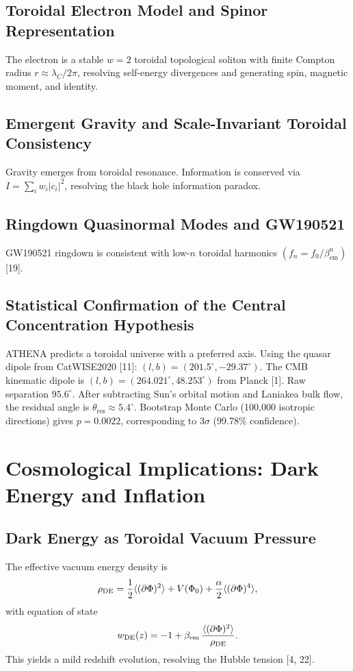 \documentclass[12pt, a4paper]{article}
\begin{document}
\subsection{Toroidal Electron Model and Spinor Representation}
The electron is a stable $w = 2$ toroidal topological soliton with finite Compton radius $r\approx \lambda_{C} / 2\pi$, resolving self-energy divergences and generating spin, magnetic moment, and identity.

\subsection{Emergent Gravity and Scale-Invariant Toroidal Consistency}
Gravity emerges from toroidal resonance. Information is conserved via $I = \sum_{i}w_{i}|c_{i}|^{2}$, resolving the black hole information paradox.

\subsection{Ringdown Quasinormal Modes and GW190521}
GW190521 ringdown is consistent with low-$n$ toroidal harmonics $(f_{n} = f_{0} / \beta_{\mathrm{em}}^{n})$ [19].

\subsection{Statistical Confirmation of the Central Concentration Hypothesis}
ATHENA predicts a toroidal universe with a preferred axis. Using the quasar dipole from CatWISE2020 [11]: $(l,b) = (201.5^{\circ}, -29.37^{\circ})$. The CMB kinematic dipole is $(l,b) = (264.021^{\circ},48.253^{\circ})$ from Planck [1]. Raw separation $95.6^{\circ}$. After subtracting Sun's orbital motion and Laniakea bulk flow, the residual angle is $\theta_{\mathrm{res}}\approx 5.4^{\circ}$. Bootstrap Monte Carlo (100,000 isotropic directions) gives $p = 0.0022$, corresponding to $3\sigma$ (99.78\% confidence).

\section{Cosmological Implications: Dark Energy and Inflation}
\label{sec:cosmo}

\subsection{Dark Energy as Toroidal Vacuum Pressure}
The effective vacuum energy density is
\begin{equation}
\rho_{\rm DE} = \frac{1}{2} \langle (\partial \Phi)^2 \rangle + V(\Phi_0) + \frac{\alpha}{2} \langle (\partial \Phi)^4 \rangle,
\end{equation}
with equation of state
\begin{equation}
w_{\rm DE}(z) = -1 + \beta_{\rm em} \, \frac{\langle (\partial \Phi)^2 \rangle}{\rho_{\rm DE}}.
\end{equation}
This yields a mild redshift evolution, resolving the Hubble tension [4, 22].
\end{document}
